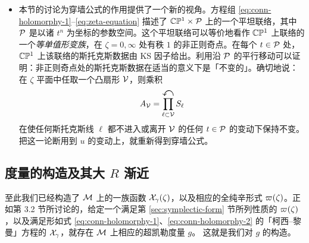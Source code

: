 \begin{itemize}
\item
本节的讨论为穿墙公式的作用提供了一个新的视角。方程组 \eqref{eq:conn-holomorphy-1}–\eqref{eq:zeta-equation} 描述了 $\mathbb{C}\mathbb{P}^1 \times \mathcal{P}$ 上的一个平坦联络，其中 $\mathcal{P}$ 是以诸 $t^n$ 为坐标的参数空间。这个平坦联络可以等价地看作 $\mathbb{C}\mathbb{P}^1$ 上联络的一个\emph{等单值形变族}，在 $\zeta=0, \infty$ 处有秩 $1$ 的非正则奇点。在每个 $t \in \mathcal{P}$ 处，$\mathbb{C}\mathbb{P}^1$ 上该联络的斯托克斯数据由 KS 因子给出。利用沿 $\mathcal{P}$ 的平行移动可以证明：非正则奇点处的斯托克斯数据在适当的意义下是「不变的」。确切地说：在 $\zeta$ 平面中任取一个凸扇形 $\mathcal{V}$，则乘积
\begin{equation}
A_{\mathcal{V}} = \prod_{\ell \subset \mathcal{V}}^{\text{\Large$\curvearrowleft$}} S_\ell
\end{equation}
在使任何斯托克斯线 $\ell$ 都不进入或离开 $\mathcal{V}$ 的任何 $t \in \mathcal{P}$ 的变动下保持不变。把这一论断用到 $u$ 的变动上，就重新得到穿墙公式。
\end{itemize}

\subsection{度量的构造及其大 $R$ 渐近}
\label{sec:metric-construction}

至此我们已经构造了 $\mathcal{M}$ 上的一族函数 $\mathcal{X}_\gamma(\zeta)$，以及相应的全纯辛形式 $\varpi(\zeta)$。正如第 3.2 节所讨论的，给定一个满足第 \ref{sec:symplectic-form} 节所列性质的 $\varpi(\zeta)$，以及满足形如式 \eqref{eq:conn-holomorphy-1}、\eqref{eq:conn-holomorphy-2} 的「柯西--黎曼」方程的 $\mathcal{X}_\gamma$，就存在 $\mathcal{M}$ 上相应的超凯勒度量 $g$。%
这就是我们对 $g$ 的构造。

